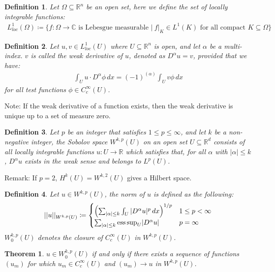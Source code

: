 \documentclass[11pt]{book}
\theoremstyle{break}
\theoremstyle{break}
\newtheorem{thm}{Theorem}[section]
\newtheorem{defn}{Definition}[corL]
\newcommand{\R}{\mathbb{R}}
\newcommand{\C}{\mathbb{C}}
\newcommand{\note}{\color{red}Note: \color{black}}
\newcommand{\remark}{\color{blue}Remark: \color{black}}
\begin{document}
\begin{defn}
Let $\Omega \subseteq \R^n$ be an open set, here we define the set of locally integrable functions:
\begin{align*}
L^1_{loc}(\Omega)\coloneqq \{f:\Omega \to \C \text{ is Lebesgue measurable } |\ f|_K \in L^1(K)\text{ for all compact }K\subseteq \Omega\}
\end{align*}
\end{defn}

\begin{defn}
Let $u,v \in L_{loc}^1(U)$ where $U\subseteq \R^n$ is open, and let $\alpha$ be a multi-index. $v$ is called the weak derivative of $u$, denoted as $D^\alpha u = v$, provided that we have:
\begin{align*}
\int_U u \cdot D^\alpha \phi\, dx = (-1)^{(\alpha)} \int_U v\phi\, dx
\end{align*}
for all test functions $\phi \in C_c^\infty (U)$. 
\end{defn}
\note If the weak derivative of a function exists, then the weak derivative is unique up to a set of measure zero. \\

\begin{defn}
Let $p$ be an integer that satisfies $1 \leq p \leq \infty$, and let $k$ be a non-negative integer, the Sobolov space $W^{k,p}(U)$ on an open set $U \subseteq \R^d$ consists of all locally integrable functions $u:U \to \R$ which satisfies that, for all $\alpha$ with $|\alpha | \leq k$, $D^\alpha u$ exists in the weak sense and belongs to $L^p(U)$. 
\end{defn}

\remark If $p=2$, $H^k(U) = W^{k,2}(U)$ gives a Hilbert space. 

\begin{defn}
Let $u \in W^{k,p}(U)$, the norm of $u$ is defined as the following:
\begin{align*}
||u||_{W^{k,p}(U)} \coloneqq \begin{cases}
\left(\sum_{|\alpha|\leq k}\int_U |D^\alpha u |^p \, dx\right)^{1/p} & 1\leq p <\infty\\
\sum_{|\alpha|\leq k}\text{ess\,sup}_U |D^\alpha u | & p =\infty
\end{cases}
\end{align*}
$W_0^{k,p}(U)$ denotes the closure of $C_c^\infty(U)$ in $W^{k,p}(U)$. 
\end{defn}


\begin{thm}
$u\in W_0^{k,p}(U)$ if and only if there exists a sequence of functions $(u_m)$ for which $u_m \in C_c^\infty(U)$ and $(u_m) \to u$ in $W^{k,p}(U)$. 
\end{thm}
\end{document}
